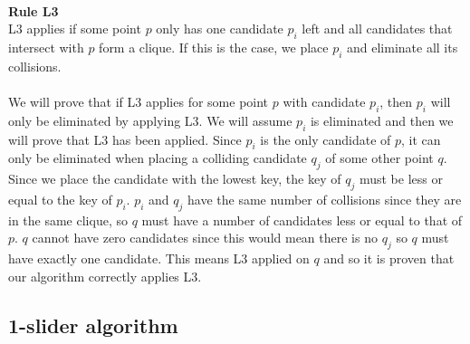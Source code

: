 \documentclass[crop=false,a4paper,oneside,11pt]{article}
\begin{document}
\\
\textbf{Rule L3}\\
L3 applies if some point $p$ only has one candidate $p_i$ left and all candidates that intersect with $p$ form a clique. If this is the case, we place $p_i$ and eliminate all its collisions.\\
\\
We will prove that if L3 applies for some point $p$ with candidate $p_i$, then $p_i$ will only be eliminated by applying L3. We will assume $p_i$ is eliminated and then we will prove that L3 has been applied. Since $p_i$ is the only candidate of $p$, it can only be eliminated when placing a colliding candidate $q_j$ of some other point $q$. Since we place the candidate with the lowest key, the key of $q_j$ must be less or equal to the key of $p_i$. $p_i$ and $q_j$ have the same number of collisions since they are in the same clique, so $q$ must have a number of candidates less or equal to that of $p$. $q$ cannot have zero candidates since this would mean there is no $q_j$ so $q$ must have exactly one candidate. This means L3 applied on $q$ and so it is proven that our algorithm correctly applies L3.

\subsection{1-slider algorithm}
\end{document}
